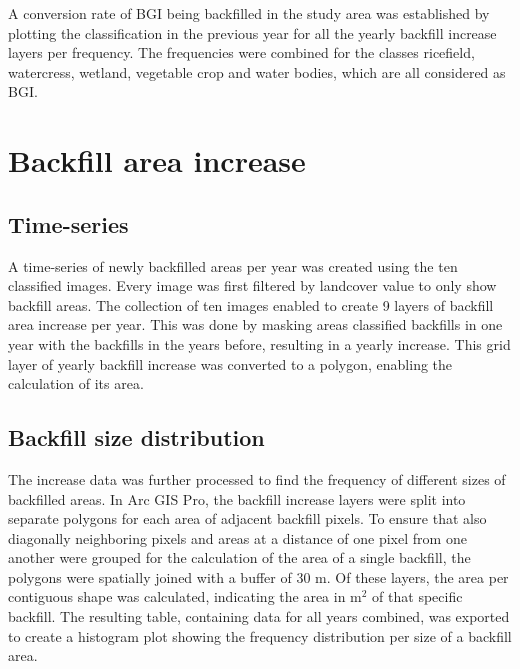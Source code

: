\documentclass[11pt, A4, oneside]{report}
\begin{document}
A conversion rate of BGI being backfilled in the study area was established by plotting the classification in the previous year for all the yearly backfill increase layers per frequency. The frequencies were combined for the classes ricefield, watercress, wetland, vegetable crop and water bodies, which are all considered as BGI.

\section{Backfill area increase}
\subsection{Time-series}
A time-series of newly backfilled areas per year was created using the ten classified images. Every image was first filtered by landcover value to only show backfill areas. The collection of ten images enabled to create 9 layers of backfill area increase per year. This was done by masking areas classified backfills in one year with the backfills in the years before, resulting in a yearly increase. This grid layer of yearly backfill increase was converted to a polygon, enabling the calculation of its area.

\subsection{Backfill size distribution}
The increase data was further processed to find the frequency of different sizes of backfilled areas. In Arc GIS Pro, the backfill increase layers were split into separate polygons for each area of adjacent backfill pixels. To ensure that also diagonally neighboring pixels and areas at a distance of one pixel from one another were grouped for the calculation of the area of a single backfill, the polygons were spatially joined with a buffer of 30 m. Of these layers, the area per contiguous shape was calculated, indicating the area in m$^2$ of that specific backfill. The resulting table, containing data for all years combined, was exported to create a histogram plot showing the frequency distribution per size of a backfill area. 
\end{document}
